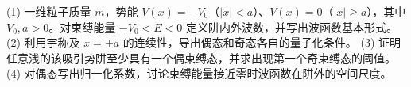 (1) 一维粒子质量 \(m\)，势能 \(V(x)=-V_0\)（\(|x|<a\)）、\(V(x)=0\)（\(|x|\ge a\)），其中 \(V_0,a>0\)。对束缚能量 \(-V_0<E<0\) 定义阱内外波数，并写出波函数基本形式。
(2) 利用宇称及 \(x=\pm a\) 的连续性，导出偶态和奇态各自的量子化条件。
(3) 证明任意浅的该吸引势阱至少具有一个偶束缚态，并求出现第一个奇束缚态的阈值。
(4) 对偶态写出归一化系数，讨论束缚能量接近零时波函数在阱外的空间尺度。
